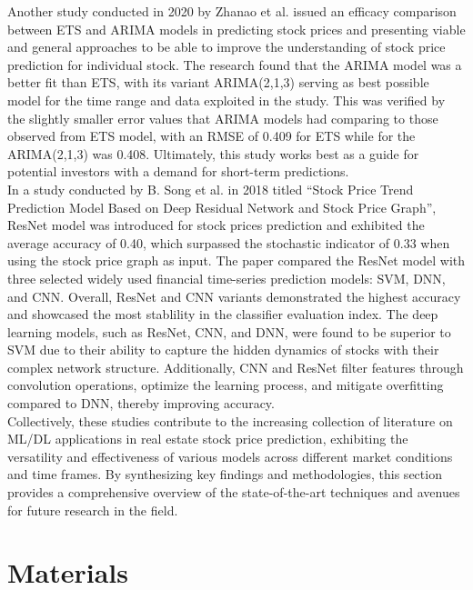 \documentclass[conference]{IEEEtran}
\begin{document}
Another study conducted in 2020 by Zhanao et al. \cite{b6} issued an efficacy comparison between ETS and ARIMA models in predicting stock prices and presenting viable and general approaches to be able to improve the understanding of stock price prediction for individual stock. The research found that the ARIMA model was a better fit than ETS, with its variant ARIMA(2,1,3) serving as best possible model for the time range and data exploited in the study. This was verified by the slightly smaller error values that ARIMA models had comparing to those observed from ETS model, with an RMSE of 0.409 for ETS while for the ARIMA(2,1,3) was 0.408. Ultimately, this study works best as a guide for potential investors with a demand for short-term predictions. \\

In a study conducted by B. Song et al. \cite{b7} in 2018 titled “Stock Price Trend Prediction Model Based on Deep Residual Network and Stock Price Graph”, ResNet model was introduced for stock prices prediction and exhibited the average accuracy of 0.40, which surpassed the stochastic indicator of 0.33 when using the stock price graph as input. The paper compared the ResNet model with three selected widely used financial time-series prediction models: SVM, DNN, and CNN. Overall, ResNet and CNN variants demonstrated the highest accuracy and showcased the most stablility in the classifier evaluation index. The deep learning models, such as ResNet, CNN, and DNN, were found to be superior to SVM due to their ability to capture the hidden dynamics of stocks with their complex network structure. Additionally, CNN and ResNet filter features through convolution operations, optimize the learning process, and mitigate overfitting compared to DNN, thereby improving accuracy. \\

Collectively, these studies contribute to the increasing collection of literature on ML/DL applications in real estate stock price prediction, exhibiting the versatility and effectiveness of various models across different market conditions and time frames. By synthesizing key findings and methodologies, this section provides a comprehensive overview of the state-of-the-art techniques and avenues for future research in the field.

\section{\textbf{Materials}}
\end{document}

